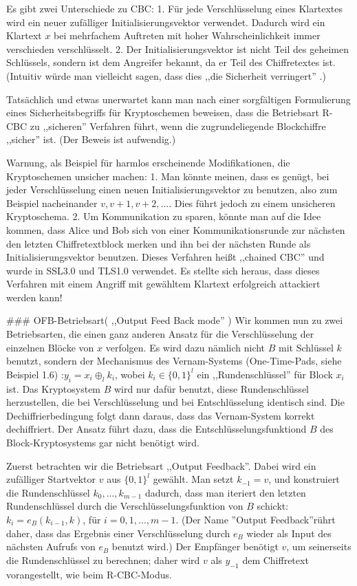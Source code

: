 \documentclass[a4paper]{article}
\begin{document}
\begin{multicols}{3}
        Es gibt zwei Unterschiede zu CBC:
        1. Für jede Verschlüsselung eines Klartextes wird ein neuer zufälliger Initialisierungsvektor verwendet. Dadurch wird ein Klartext $x$ bei mehrfachem Auftreten mit hoher Wahrscheinlichkeit immer verschieden verschlüsselt.
        2. Der Initialisierungsvektor ist nicht Teil des geheimen Schlüssels, sondern ist dem Angreifer bekannt, da er Teil des Chiffretextes ist. (Intuitiv würde man vielleicht sagen, dass dies ,,die Sicherheit verringert'' .)

        Tatsächlich und etwas unerwartet kann man nach einer sorgfältigen Formulierung eines Sicherheitsbegriffs für Kryptoschemen beweisen, dass die Betriebsart R-CBC zu ,,sicheren'' Verfahren führt, wenn die zugrundeliegende Blockchiffre ,,sicher'' ist. (Der Beweis ist
        aufwendig.)

        Warnung, als Beispiel für harmlos erscheinende Modifikationen, die Kryptoschemen unsicher machen:
        1. Man könnte meinen, dass es genügt, bei jeder Verschlüsselung einen neuen Initialisierungsvektor zu benutzen, also zum Beispiel nacheinander $v,v+1,v+2,...$. Dies führt jedoch zu einem unsicheren Kryptoschema.
        2. Um Kommunikation zu sparen, könnte man auf die Idee kommen, dass Alice und Bob sich von einer Kommunikationsrunde zur nächsten den letzten Chiffretextblock merken und ihn bei der nächsten Runde als Initialisierungsvektor benutzen. Dieses Verfahren heißt ,,chained CBC'' und wurde in SSL3.0 und TLS1.0 verwendet. Es stellte sich heraus, dass dieses Verfahren mit einem Angriff mit gewähltem Klartext erfolgreich attackiert werden kann!

        ### OFB-Betriebsart( ,,Output Feed Back mode'' )
        Wir kommen nun zu zwei Betriebsarten, die einen ganz anderen Ansatz für die Verschlüsselung der einzelnen Blöcke von $x$ verfolgen. Es wird dazu nämlich nicht $B$ mit Schlüssel $k$ benutzt, sondern der Mechanismus des Vernam-Systems (One-Time-Pads, siehe Beispiel 1.6) :$y_i=x_i\oplus_l k_i$, wobei $k_i\in\{0,1\}^l$ ein ,,Rundenschlüssel'' für Block $x_i$ ist. Das Kryptosystem $B$ wird nur dafür benutzt, diese Rundenschlüssel herzustellen, die bei Verschlüsselung und bei Entschlüsselung identisch sind. Die Dechiffrierbedingung folgt dann daraus, dass das Vernam-System korrekt dechiffriert. Der Ansatz führt dazu, dass die Entschlüsselungsfunktiond $B$ des Block-Kryptosystems gar nicht benötigt wird.

        Zuerst betrachten wir die Betriebsart ,,Output Feedback''. Dabei wird ein zufälliger Startvektor $v$ aus $\{0,1\}^l$ gewählt. Man setzt $k_{-1}=v$, und konstruiert die Rundenschlüssel $k_0,...,k_{m-1}$ dadurch, dass man iteriert den letzten Rundenschlüssel durch die Verschlüsselungsfunktion von $B$ schickt: $k_i=e_B(k_{i-1}, k)$, für $i=0,1,...,m-1$. (Der Name ''Output Feedback''rührt daher, dass das Ergebnis einer Verschlüsselung durch $e_B$ wieder als Input des nächsten Aufrufs von $e_B$ benutzt wird.) Der Empfänger benötigt $v$, um seinerseits die Rundenschlüssel zu berechnen; daher wird $v$ als $y_{-1}$ dem Chiffretext vorangestellt, wie beim R-CBC-Modus.


\end{multicols}
\end{document}
